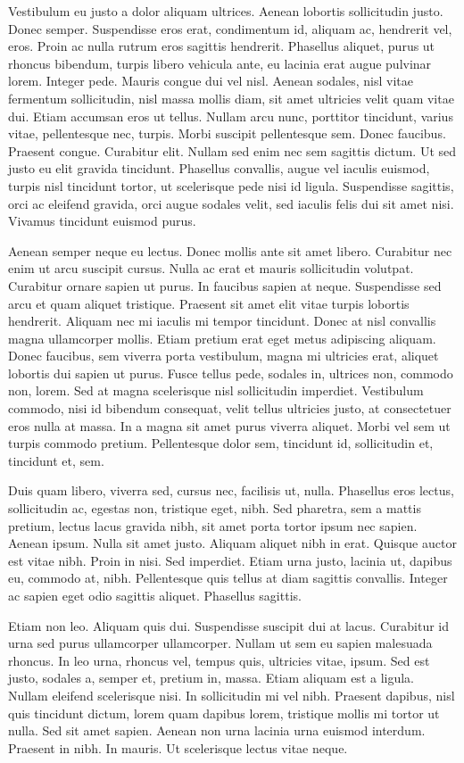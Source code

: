Vestibulum eu justo a dolor aliquam ultrices. Aenean lobortis sollicitudin justo. Donec semper. Suspendisse eros erat, condimentum id, aliquam ac, hendrerit vel, eros. Proin ac nulla rutrum eros sagittis hendrerit. Phasellus aliquet, purus ut rhoncus bibendum, turpis libero vehicula ante, eu lacinia erat augue pulvinar lorem. Integer pede. Mauris congue dui vel nisl. Aenean sodales, nisl vitae fermentum sollicitudin, nisl massa mollis diam, sit amet ultricies velit quam vitae dui. Etiam accumsan eros ut tellus. Nullam arcu nunc, porttitor tincidunt, varius vitae, pellentesque nec, turpis. Morbi suscipit pellentesque sem. Donec faucibus. Praesent congue. Curabitur elit. Nullam sed enim nec sem sagittis dictum. Ut sed justo eu elit gravida tincidunt. Phasellus convallis, augue vel iaculis euismod, turpis nisl tincidunt tortor, ut scelerisque pede nisi id ligula. Suspendisse sagittis, orci ac eleifend gravida, orci augue sodales velit, sed iaculis felis dui sit amet nisi. Vivamus tincidunt euismod purus.

Aenean semper neque eu lectus. Donec mollis ante sit amet libero. Curabitur nec enim ut arcu suscipit cursus. Nulla ac erat et mauris sollicitudin volutpat. Curabitur ornare sapien ut purus. In faucibus sapien at neque. Suspendisse sed arcu et quam aliquet tristique. Praesent sit amet elit vitae turpis lobortis hendrerit. Aliquam nec mi iaculis mi tempor tincidunt. Donec at nisl convallis magna ullamcorper mollis. Etiam pretium erat eget metus adipiscing aliquam. Donec faucibus, sem viverra porta vestibulum, magna mi ultricies erat, aliquet lobortis dui sapien ut purus. Fusce tellus pede, sodales in, ultrices non, commodo non, lorem. Sed at magna scelerisque nisl sollicitudin imperdiet. Vestibulum commodo, nisi id bibendum consequat, velit tellus ultricies justo, at consectetuer eros nulla at massa. In a magna sit amet purus viverra aliquet. Morbi vel sem ut turpis commodo pretium. Pellentesque dolor sem, tincidunt id, sollicitudin et, tincidunt et, sem.

Duis quam libero, viverra sed, cursus nec, facilisis ut, nulla. Phasellus eros lectus, sollicitudin ac, egestas non, tristique eget, nibh. Sed pharetra, sem a mattis pretium, lectus lacus gravida nibh, sit amet porta tortor ipsum nec sapien. Aenean ipsum. Nulla sit amet justo. Aliquam aliquet nibh in erat. Quisque auctor est vitae nibh. Proin in nisi. Sed imperdiet. Etiam urna justo, lacinia ut, dapibus eu, commodo at, nibh. Pellentesque quis tellus at diam sagittis convallis. Integer ac sapien eget odio sagittis aliquet. Phasellus sagittis.

Etiam non leo. Aliquam quis dui. Suspendisse suscipit dui at lacus. Curabitur id urna sed purus ullamcorper ullamcorper. Nullam ut sem eu sapien malesuada rhoncus. In leo urna, rhoncus vel, tempus quis, ultricies vitae, ipsum. Sed est justo, sodales a, semper et, pretium in, massa. Etiam aliquam est a ligula. Nullam eleifend scelerisque nisi. In sollicitudin mi vel nibh. Praesent dapibus, nisl quis tincidunt dictum, lorem quam dapibus lorem, tristique mollis mi tortor ut nulla. Sed sit amet sapien. Aenean non urna lacinia urna euismod interdum. Praesent in nibh. In mauris. Ut scelerisque lectus vitae neque.



%
%
